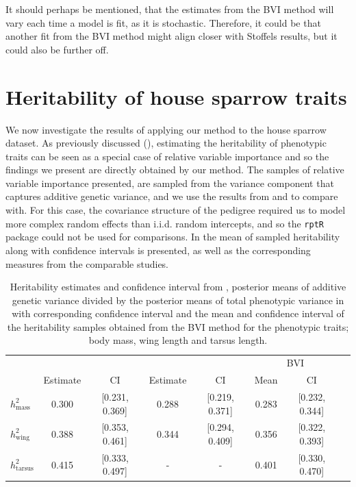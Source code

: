 \noindent It should perhaps be mentioned, that the estimates from the BVI method will vary each time a model is fit, as it is stochastic. Therefore, it could be that another fit from the BVI method might align closer with Stoffels results, but it could also be further off. 
\section{Heritability of house sparrow traits}
We now investigate the results of applying our method to the house sparrow dataset. As previously discussed (), estimating the heritability of phenotypic traits can be seen as a special case of relative variable importance and so the findings we present are directly obtained by our method. The samples of relative variable importance presented, are sampled from the variance component that captures additive genetic variance, and we use the results from \citet{Silva2017} and \citet{Muff2019Genetic} to compare with. For this case, the covariance structure of the pedigree required us to model more complex random effects than i.i.d. random intercepts, and so the \texttt{rptR} package could not be used for comparisons. In  the mean of sampled heritability along with confidence intervals is presented, as well as the corresponding measures from the comparable studies.
\begin{table}[H]
  \centering
  \begin{tabular}{lccccccc}
  \toprule
   & \multicolumn{2}{c}{\citet{Silva2017}} & \multicolumn{2}{c}{\citet{Muff2019Genetic}} & \multicolumn{2}{c}{BVI} \\ 
   \cmidrule(lr){2-3} \cmidrule(lr){4-5} \cmidrule(lr){6-7}
   & Estimate & CI & Estimate & CI & Mean & CI \\ 
  \midrule
  $h^2_{\text{mass}}$    & 0.300 & [0.231, 0.369] & 0.288 & [0.219, 0.371] & 0.283 & [0.232, 0.344] \\
  $h^2_{\text{wing}}$    & 0.388 & [0.353, 0.461] & 0.344 & [0.294, 0.409] & 0.356 & [0.322, 0.393] \\
  $h^2_{\text{tarsus}}$  & 0.415 & [0.333, 0.497] & - & - & 0.401 & [0.330, 0.470] \\ 
  \bottomrule
  \end{tabular}
  \caption{Heritability estimates and confidence interval from \citet{Silva2017}, posterior means of additive genetic variance divided by the posterior means of total phenotypic variance in \citet{Muff2019Genetic} with corresponding confidence interval and the mean and confidence interval of the heritability samples obtained from the BVI method for the phenotypic traits; body mass, wing length and tarsus length.}
  \label{table:summary_heritability}
\end{table}
